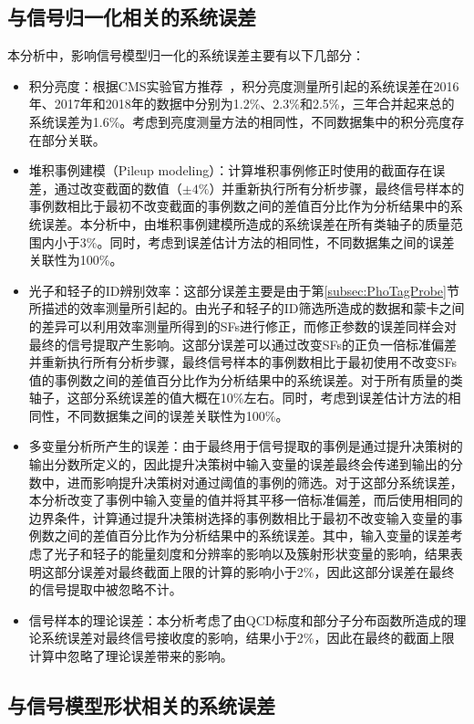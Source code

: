 \subsection{与信号归一化相关的系统误差}

本分析中，影响信号模型归一化的系统误差主要有以下几部分：
\begin{itemize}
    \item 积分亮度：根据CMS实验官方推荐~\cite{CMS-PAS-LUM-17-001,CMS-PAS-LUM-17-004,CMS-PAS-LUM-18-002}，积分亮度测量所引起的系统误差在2016年、2017年和2018年的数据中分别为1.2\%、2.3\%和2.5\%，三年合并起来总的系统误差为1.6\%。考虑到亮度测量方法的相同性，不同数据集中的积分亮度存在部分关联。
    \item 堆积事例建模（Pileup modeling）：计算堆积事例修正时使用的截面存在误差，通过改变截面的数值（$\pm4\%$）并重新执行所有分析步骤，最终信号样本的事例数相比于最初不改变截面的事例数之间的差值百分比作为分析结果中的系统误差。本分析中，由堆积事例建模所造成的系统误差在所有类轴子的质量范围内小于3\%。同时，考虑到误差估计方法的相同性，不同数据集之间的误差关联性为100\%。
    \item 光子和轻子的ID辨别效率：这部分误差主要是由于第\ref{subsec:PhoTagProbe}节所描述的效率测量所引起的。由光子和轻子的ID筛选所造成的数据和蒙卡之间的差异可以利用效率测量所得到的SFs进行修正，而修正参数的误差同样会对最终的信号提取产生影响。这部分误差可以通过改变SFs的正负一倍标准偏差并重新执行所有分析步骤，最终信号样本的事例数相比于最初使用不改变SFs值的事例数之间的差值百分比作为分析结果中的系统误差。对于所有质量的类轴子，这部分系统误差的值大概在10\%左右。同时，考虑到误差估计方法的相同性，不同数据集之间的误差关联性为100\%。
    \item 多变量分析所产生的误差：由于最终用于信号提取的事例是通过提升决策树的输出分数所定义的，因此提升决策树中输入变量的误差最终会传递到输出的分数中，进而影响提升决策树对通过阈值的事例的筛选。对于这部分系统误差，本分析改变了事例中输入变量的值并将其平移一倍标准偏差，而后使用相同的边界条件，计算通过提升决策树选择的事例数相比于最初不改变输入变量的事例数之间的差值百分比作为分析结果中的系统误差。其中，输入变量的误差考虑了光子和轻子的能量刻度和分辨率的影响以及簇射形状变量的影响，结果表明这部分误差对最终截面上限的计算的影响小于2\%，因此这部分误差在最终的信号提取中被忽略不计。
    \item 信号样本的理论误差：本分析考虑了由QCD标度和部分子分布函数所造成的理论系统误差对最终信号接收度的影响，结果小于2\%，因此在最终的截面上限计算中忽略了理论误差带来的影响。
\end{itemize}

\subsection{与信号模型形状相关的系统误差}

